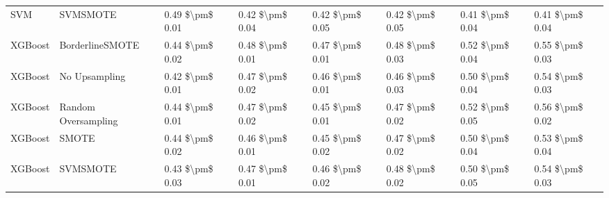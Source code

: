 \begin{tabular}{llllllll}
                            SVM &                      SVMSMOTE & 0.49 \$\textbackslash pm\$ 0.01 &           0.42 \$\textbackslash pm\$ 0.04 &       0.42 \$\textbackslash pm\$ 0.05 &        0.42 \$\textbackslash pm\$ 0.05 &                         0.41 \$\textbackslash pm\$ 0.04 &     0.41 \$\textbackslash pm\$ 0.04 \\
                        XGBoost &               BorderlineSMOTE & 0.44 \$\textbackslash pm\$ 0.02 &           0.48 \$\textbackslash pm\$ 0.01 &       0.47 \$\textbackslash pm\$ 0.01 &        0.48 \$\textbackslash pm\$ 0.03 &                         0.52 \$\textbackslash pm\$ 0.04 &     0.55 \$\textbackslash pm\$ 0.03 \\
                        XGBoost &                 No Upsampling & 0.42 \$\textbackslash pm\$ 0.01 &           0.47 \$\textbackslash pm\$ 0.02 &       0.46 \$\textbackslash pm\$ 0.01 &        0.46 \$\textbackslash pm\$ 0.03 &                         0.50 \$\textbackslash pm\$ 0.04 &     0.54 \$\textbackslash pm\$ 0.03 \\
                        XGBoost &           Random Oversampling & 0.44 \$\textbackslash pm\$ 0.01 &           0.47 \$\textbackslash pm\$ 0.02 &       0.45 \$\textbackslash pm\$ 0.01 &        0.47 \$\textbackslash pm\$ 0.02 &                         0.52 \$\textbackslash pm\$ 0.05 &     0.56 \$\textbackslash pm\$ 0.02 \\
                        XGBoost &                         SMOTE & 0.44 \$\textbackslash pm\$ 0.02 &           0.46 \$\textbackslash pm\$ 0.01 &       0.45 \$\textbackslash pm\$ 0.02 &        0.47 \$\textbackslash pm\$ 0.02 &                         0.50 \$\textbackslash pm\$ 0.04 &     0.53 \$\textbackslash pm\$ 0.04 \\
                        XGBoost &                      SVMSMOTE & 0.43 \$\textbackslash pm\$ 0.03 &           0.47 \$\textbackslash pm\$ 0.01 &       0.46 \$\textbackslash pm\$ 0.02 &        0.48 \$\textbackslash pm\$ 0.02 &                         0.50 \$\textbackslash pm\$ 0.05 &     0.54 \$\textbackslash pm\$ 0.03 \\
\bottomrule
\end{tabular}

